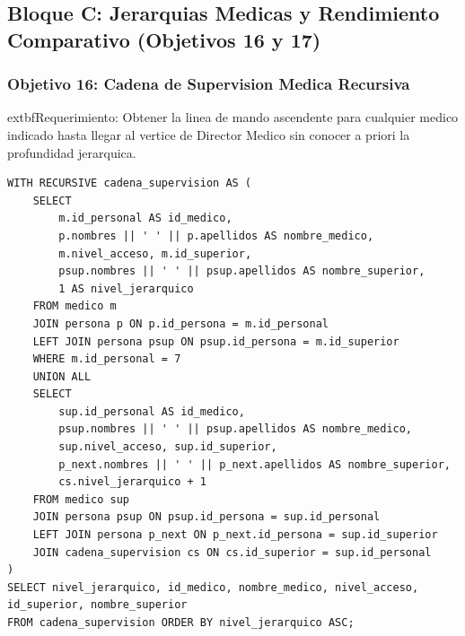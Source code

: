 \documentclass[11pt,a4paper]{article}
\begin{document}
\subsection{Bloque C: Jerarquias Medicas y Rendimiento Comparativo (Objetivos 16 y 17)}

\subsubsection{Objetivo 16: Cadena de Supervision Medica Recursiva}
	extbf{Requerimiento:} Obtener la linea de mando ascendente para cualquier medico indicado hasta llegar al vertice de Director Medico sin conocer a priori la profundidad jerarquica.
\begin{lstlisting}[style=sqlstyle]
WITH RECURSIVE cadena_supervision AS (
    SELECT 
        m.id_personal AS id_medico,
        p.nombres || ' ' || p.apellidos AS nombre_medico,
        m.nivel_acceso, m.id_superior,
        psup.nombres || ' ' || psup.apellidos AS nombre_superior,
        1 AS nivel_jerarquico
    FROM medico m
    JOIN persona p ON p.id_persona = m.id_personal
    LEFT JOIN persona psup ON psup.id_persona = m.id_superior
    WHERE m.id_personal = 7
    UNION ALL
    SELECT 
        sup.id_personal AS id_medico,
        psup.nombres || ' ' || psup.apellidos AS nombre_medico,
        sup.nivel_acceso, sup.id_superior,
        p_next.nombres || ' ' || p_next.apellidos AS nombre_superior,
        cs.nivel_jerarquico + 1
    FROM medico sup
    JOIN persona psup ON psup.id_persona = sup.id_personal
    LEFT JOIN persona p_next ON p_next.id_persona = sup.id_superior
    JOIN cadena_supervision cs ON cs.id_superior = sup.id_personal
)
SELECT nivel_jerarquico, id_medico, nombre_medico, nivel_acceso, id_superior, nombre_superior
FROM cadena_supervision ORDER BY nivel_jerarquico ASC;
\end{lstlisting}
\end{document}
